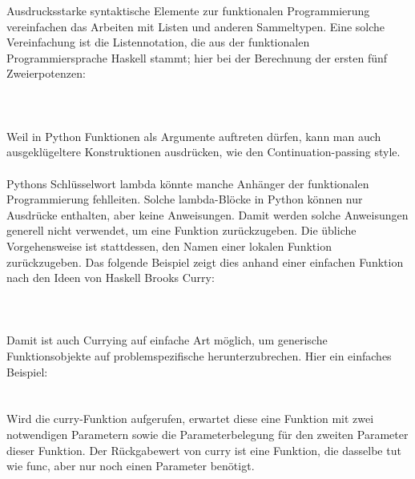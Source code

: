 Ausdrucksstarke syntaktische Elemente zur funktionalen Programmierung vereinfachen das Arbeiten mit Listen und anderen Sammeltypen. Eine solche Vereinfachung ist die Listennotation, die aus der funktionalen Programmiersprache Haskell stammt; hier bei der Berechnung der ersten fünf Zweierpotenzen:\\
\\
\\
\\
Weil in Python Funktionen als Argumente auftreten dürfen, kann man auch ausgeklügeltere Konstruktionen ausdrücken, wie den Continuation-passing style.\\
\\
Pythons Schlüsselwort lambda könnte manche Anhänger der funktionalen Programmierung fehlleiten. Solche lambda-Blöcke in Python können nur Ausdrücke enthalten, aber keine Anweisungen. Damit werden solche Anweisungen generell nicht verwendet, um eine Funktion zurückzugeben. Die übliche Vorgehensweise ist stattdessen, den Namen einer lokalen Funktion zurückzugeben. Das folgende Beispiel zeigt dies anhand einer einfachen Funktion nach den Ideen von Haskell Brooks Curry:\\
\\
\\
\\
Damit ist auch Currying auf einfache Art möglich, um generische Funktionsobjekte auf problemspezifische herunterzubrechen. Hier ein einfaches Beispiel:\\
\\
\\
Wird die curry-Funktion aufgerufen, erwartet diese eine Funktion mit zwei notwendigen Parametern sowie die Parameterbelegung für den zweiten Parameter dieser Funktion. Der Rückgabewert von curry ist eine Funktion, die dasselbe tut wie func, aber nur noch einen Parameter benötigt.\\
